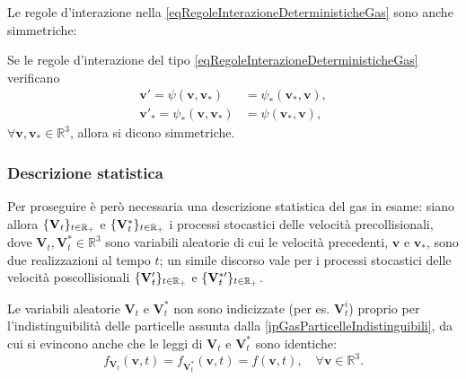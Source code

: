         Le regole d'interazione nella \cref{eqRegoleInterazioneDeterministicheGas} sono anche simmetriche:

        \begin{dfn}
          \label{defLeggiInterazioneSimmetricheGas}
          Se le regole d'interazione del tipo \eqref{eqRegoleInterazioneDeterministicheGas} verificano
          \[
            \begin{aligned}
              \mathbf v'=\psi(\mathbf v,\mathbf v_*)&=\psi_*(\mathbf v_*,\mathbf v),\\
              \mathbf v'_*=\psi_*(\mathbf v,\mathbf v_*)&=\psi(\mathbf v_*,\mathbf v),
            \end{aligned}
          \]
          \(\forall\mathbf v,\mathbf v_*\in\mathbb R^3\), allora si dicono simmetriche.
        \end{dfn}

      \subsubsection{Descrizione statistica}

        Per proseguire è però necessaria una descrizione statistica del gas in esame: siano allora \(\{\mathbf V_t\}_{t\in\mathbb R_+}\) e \(\{\mathbf V_t^*\}_{t\in\mathbb R_+}\) i processi stocastici delle velocità precollisionali, dove \(\mathbf V_t,\mathbf V_t^*\in\mathbb R^3\) sono variabili aleatorie di cui le velocità precedenti, \(\mathbf v\) e \(\mathbf v_*\), sono due realizzazioni al tempo \(t\); un simile discorso vale per i processi stocastici delle velocità poscollisionali \(\{\mathbf V'_t\}_{t\in\mathbb R_+}\) e \(\{\mathbf V^{*\prime}_t\}_{t\in\mathbb R_+}\).

        \begin{oss}
          \label{ossLeggiIndistinguibili}
          Le variabili aleatorie \(\mathbf V_t\) e \(\mathbf V^*_t\) non sono indicizzate (per es. \(\mathbf V^i_t\)) proprio per l'indistinguibilità delle particelle assunta dalla \ref{ipGasParticelleIndistinguibili}, da cui si evincono anche che le leggi di \(\mathbf V_t\) e \(\mathbf V^*_t\) sono identiche:
          \[
            f_{\mathbf V_t}(\mathbf v,t)=f_{\mathbf V^*_t}(\mathbf v,t)=f(\mathbf v,t),
            \quad\forall \mathbf v\in\mathbb R^3.
          \]
        \end{oss}

